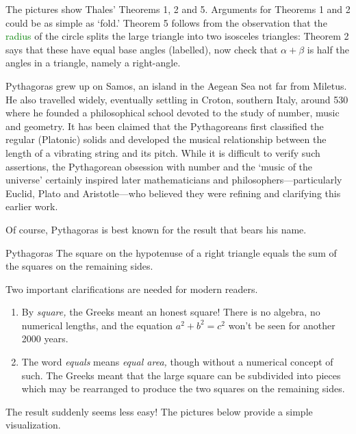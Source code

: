 The pictures show Thales' Theorems 1, 2 and 5. Arguments for Theorems 1 and 2 could be as simple as `fold.' Theorem 5 follows from the observation that the \textcolor{Green}{radius} of the circle splits the large triangle into two isosceles triangles: Theorem 2 says that these have equal base angles (labelled), now check that $\alpha+\beta$ is half the angles in a triangle, namely a right-angle.



Pythagoras grew up on Samos, an island in the Aegean Sea not far from Miletus. He also travelled widely, eventually settling in Croton, southern Italy, around 530\,\BC{} where he founded a philosophical school devoted to the study of number, music and geometry. It has been claimed that the Pythagoreans first classified the regular (Platonic) solids and developed the musical relationship between the length of a vibrating string and its pitch. While it is difficult to verify such assertions, the Pythagorean obsession with number and the `music of the universe' certainly inspired later mathematicians and philosophers---particularly Euclid, Plato and Aristotle---who believed they were refining and clarifying this earlier work.
\smallbreak

Of course, Pythagoras is best known for the result that bears his name.

\begin{thm}{Pythagoras}{}
	The square on the hypotenuse of a right triangle equals the sum of the squares on the remaining sides.
\end{thm}

Two important clarifications are needed for modern readers.
\begin{enumerate}\itemsep0pt
  \item By \emph{square,} the Greeks meant an honest square! There is no algebra, no numerical lengths, and the equation $a^2+b^2=c^2$ won't be seen for another 2000 years.
  \item The word \emph{equals} means \emph{equal area,} though without a numerical concept of such. The Greeks meant that the large square can be subdivided into pieces which may be rearranged to produce the two squares on the remaining sides.
\end{enumerate}

\goodbreak

The result suddenly seems less easy! The pictures below provide a simple visualization.


